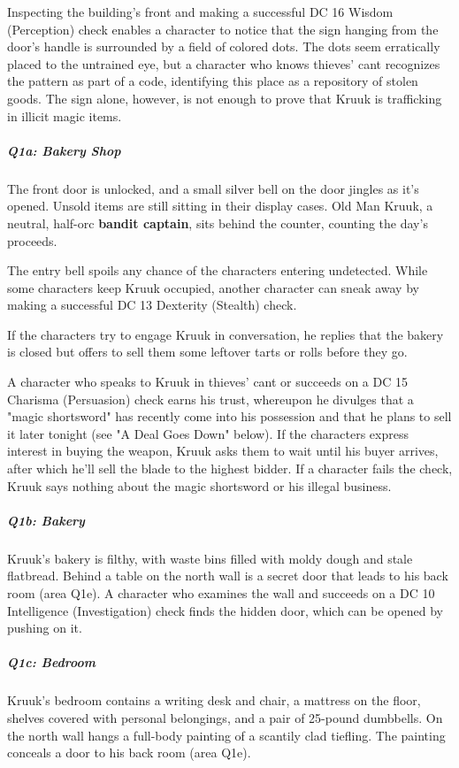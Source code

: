 \documentclass[10pt,a4paper,twoside,bg=print,twocolumn,openany,nodeprecatedcode]{dndbook}
\begin{document}
Inspecting the building's front and making a successful DC 16 Wisdom (Perception) check enables a character to notice that the sign hanging from the door's handle is surrounded by a field of colored dots. The dots seem erratically placed to the untrained eye, but a character who knows thieves' cant recognizes the pattern as part of a code, identifying this place as a repository of stolen goods. The sign alone, however, is not enough to prove that Kruuk is trafficking in illicit magic items.

\subparagraph{Q1a: Bakery Shop}
The front door is unlocked, and a small silver bell on the door jingles as it's opened. Unsold items are still sitting in their display cases. Old Man Kruuk, a neutral, half-orc \textbf{bandit captain}, sits behind the counter, counting the day's proceeds.

The entry bell spoils any chance of the characters entering undetected. While some characters keep Kruuk occupied, another character can sneak away by making a successful DC 13 Dexterity (Stealth) check.

If the characters try to engage Kruuk in conversation, he replies that the bakery is closed but offers to sell them some leftover tarts or rolls before they go.

A character who speaks to Kruuk in thieves' cant or succeeds on a DC 15 Charisma (Persuasion) check earns his trust, whereupon he divulges that a "magic shortsword" has recently come into his possession and that he plans to sell it later tonight (see "A Deal Goes Down" below). If the characters express interest in buying the weapon, Kruuk asks them to wait until his buyer arrives, after which he'll sell the blade to the highest bidder. If a character fails the check, Kruuk says nothing about the magic shortsword or his illegal business.

\subparagraph{Q1b: Bakery}
Kruuk's bakery is filthy, with waste bins filled with moldy dough and stale flatbread. Behind a table on the north wall is a secret door that leads to his back room (area Q1e). A character who examines the wall and succeeds on a DC 10 Intelligence (Investigation) check finds the hidden door, which can be opened by pushing on it.

\subparagraph{Q1c: Bedroom}
Kruuk's bedroom contains a writing desk and chair, a mattress on the floor, shelves covered with personal belongings, and a pair of 25-pound dumbbells. On the north wall hangs a full-body painting of a scantily clad tiefling. The painting conceals a door to his back room (area Q1e).
\end{document}
